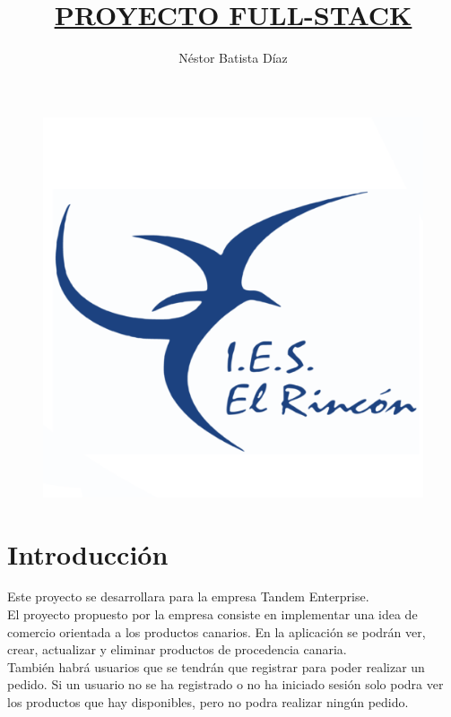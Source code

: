 \documentclass{article}
\title{\textbf{\underline{PROYECTO FULL-STACK}}}
\author{Néstor Batista Díaz }
\date{}
\begin{document}
\large
\maketitle
\vspace{20mm}
\begin{figure}[h]
    \centering
    \includegraphics[scale=0.5]{logoIES}
\end{figure}
\newpage

\newpage

\setcounter{tocdepth}{2}
\tableofcontents

\newpage

\section{Introducción}
\quad Este proyecto se desarrollara para la empresa Tandem Enterprise.\\
El proyecto propuesto por la empresa consiste en implementar una idea de comercio orientada a los productos canarios. En la aplicación se podrán ver, crear, actualizar y eliminar productos de procedencia canaria.\\También habrá usuarios que se tendrán que registrar para poder realizar un pedido. Si un usuario no se ha registrado o no ha iniciado sesión solo podra ver los productos que hay disponibles, pero no podra realizar ningún pedido.
\end{document}
